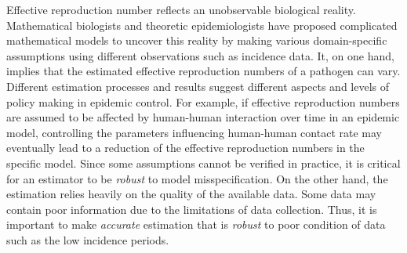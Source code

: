 Effective reproduction number reflects an unobservable biological reality. Mathematical biologists and theoretic epidemiologists have proposed complicated mathematical models to uncover this reality by making various domain-specific assumptions using different observations such as incidence data. It, on one hand, implies that the estimated effective reproduction numbers of a pathogen can vary. Different estimation processes and results suggest different aspects and levels of policy making in epidemic control. For example, if effective reproduction numbers are assumed to be affected by human-human interaction over time in an epidemic model, controlling the parameters influencing human-human contact rate may eventually lead to a reduction of the effective reproduction numbers in the specific model. Since some assumptions cannot be verified in practice, it is critical for an estimator to be \textit{robust} to model misspecification. 
On the other hand, the estimation relies heavily on the quality of the available data. Some data may contain poor information due to the limitations of data collection. Thus, it is important to make \textit{accurate} estimation that is \textit{robust} to poor condition of data such as the low incidence periods. 


